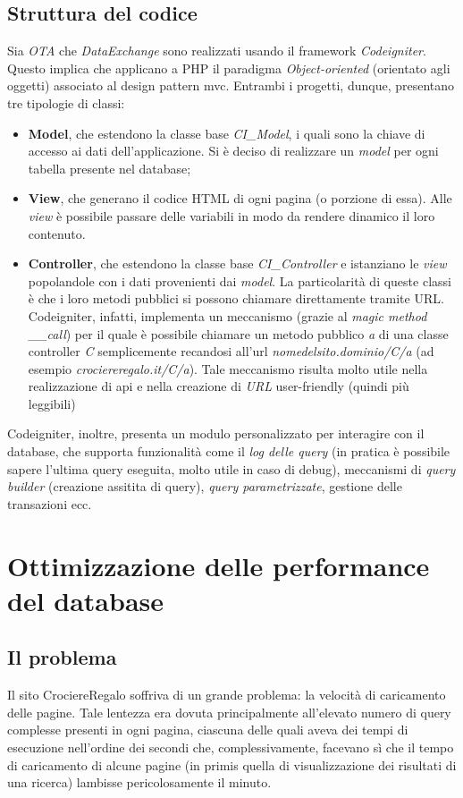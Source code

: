 \subsection{Struttura del codice}
\label{section:struttura-codice}
Sia \textit{OTA} che \textit{DataExchange} sono realizzati usando il \gls{framework} \textit{Codeigniter}. Questo implica che applicano a PHP il paradigma \textit{Object-oriented} (orientato agli oggetti) associato al design pattern \gls{mvc}. Entrambi i progetti, dunque, presentano tre tipologie di classi:
\begin{itemize}
	\item \textbf{Model}, che estendono la classe base \textit{CI\_Model}, i quali sono la chiave di accesso ai dati dell'applicazione. Si è deciso di realizzare un \textit{model} per ogni tabella presente nel database;
	\item \textbf{View}, che generano il codice HTML di ogni pagina (o porzione di essa). Alle \textit{view} è possibile passare delle variabili in modo da rendere dinamico il loro contenuto.
	\item \textbf{Controller}, che estendono la classe base \textit{CI\_Controller} e istanziano le \textit{view} popolandole con i dati provenienti dai \textit{model}. La particolarità di queste classi è che i loro metodi pubblici si possono chiamare direttamente tramite URL. Codeigniter, infatti, implementa un meccanismo (grazie al \textit{magic method \_\_call}) per il quale è possibile chiamare un metodo pubblico \textit{a} di una classe controller \textit{C} semplicemente recandosi all'url \textit{nomedelsito.dominio/C/a} (ad esempio \textit{crociereregalo.it/C/a}). Tale meccanismo risulta molto utile nella realizzazione di \gls{api} e nella creazione di \textit{URL} user-friendly (quindi più leggibili)
\end{itemize} 
Codeigniter, inoltre, presenta un modulo personalizzato per interagire con il database, che supporta funzionalità come il \textit{log delle query} (in pratica è possibile sapere l'ultima query eseguita, molto utile in caso di debug), meccanismi di \textit{query builder} (creazione assitita di query), \textit{query parametrizzate}, gestione delle transazioni ecc.

\section{Ottimizzazione delle performance del database}
\subsection{Il problema}
Il sito CrociereRegalo soffriva di un grande problema: la velocità di caricamento delle pagine. Tale lentezza era dovuta principalmente all'elevato numero di query complesse presenti in ogni pagina, ciascuna delle quali aveva dei tempi di esecuzione nell'ordine dei secondi che, complessivamente, facevano sì che il tempo di caricamento di alcune pagine (in primis quella di visualizzazione dei risultati di una ricerca) lambisse pericolosamente il minuto.
